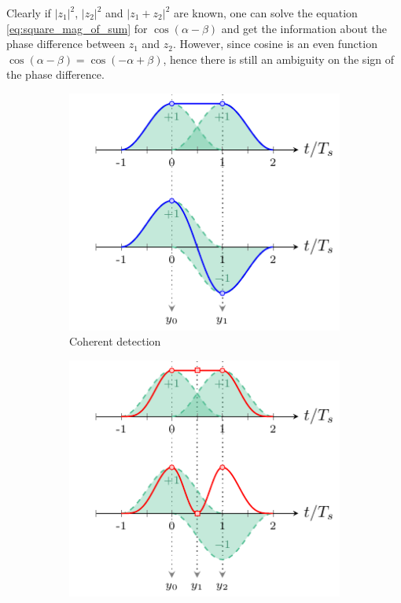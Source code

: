 Clearly if $|z_1|^2$, $|z_2|^2$ and $|z_1+z_2|^2$ are known, one can solve the equation \ref{eq:square_mag_of_sum} for $\cos(\alpha-\beta)$ and get the information about the phase difference between $z_1$ and $z_2$. However, since cosine is an even function $\cos(\alpha-\beta)=\cos(-\alpha+\beta)$, hence there is still an ambiguity on the sign of the phase difference.\\


\begin{figure}[htb]
     \centering
     \begin{subfigure}[b]{0.49\textwidth}
         \centering
         \includegraphics[width=\textwidth]{images/intro/CD_toy_example.pdf}
         \caption{Coherent detection}
         \label{fig:CD_toy_example}
     \end{subfigure}
     \hfill
     \begin{subfigure}[b]{0.49\textwidth}
         \centering
         \includegraphics[width=\textwidth]{images/intro/DD_toy_example.pdf}

\end{subfigure}
\end{figure}
